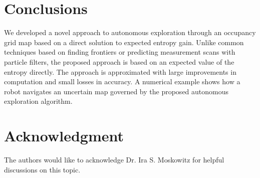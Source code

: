 \documentclass[letterpaper, 10pt, conference]{ieeeconf}
\begin{document}
\section{Conclusions}

We developed a novel approach to autonomous exploration through an occupancy grid map based on a direct solution to expected entropy gain. Unlike common techniques based on finding frontiers or predicting measurement scans with particle filters, the proposed approach is based on an expected value of the entropy directly. The approach is approximated with large improvements in computation and small losses in accuracy. A numerical example shows how a robot navigates an uncertain map governed by the proposed autonomous exploration algorithm.


\section*{Acknowledgment}
The authors would like to acknowledge Dr. Ira S. Moskowitz for helpful discussions on this topic.







%
%
%
%


%
%
%
%
\end{document}
